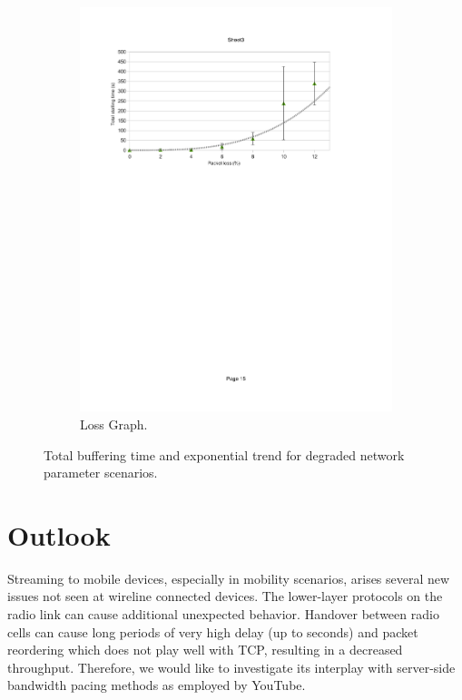 \begin{figure}[htbp]
    	\begin{subfigure}[b]{1.00\textwidth}
                \centering
                \includegraphics[width=\textwidth]{images/loss.pdf}
                \caption{Loss Graph.}
                \label{c3:fig:lossseries}
        \end{subfigure}
\caption{Total buffering time and exponential trend for degraded network parameter scenarios.}
\label{c3:fig:seriesgraphs}
\end{figure}


\section{Outlook}
\label{sec:outlook}

Streaming to mobile devices, especially in mobility scenarios, arises several new issues not seen at wireline connected devices. The lower-layer protocols on the radio link can cause additional unexpected behavior. Handover between radio cells can cause long periods of very high delay (up to seconds) and packet reordering which does not play well with TCP, resulting in a decreased throughput. Therefore, we would like to investigate its interplay with server-side bandwidth pacing methods as employed by YouTube.

